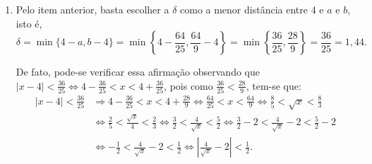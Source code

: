 \documentclass[12pt,a4paper]{article}
\begin{document}
\begin{ExerciseList}
\begin{enumerate}
\item Pelo item anterior, basta escolher a $\delta$ como a menor distância entre $4$ e $a$ e $b$, isto é,
\[
\delta
= \min\{ 4-a, b-4 \}
= \min\left\{ 4-\frac{64}{25}, \frac{64}{9}-4 \right\}
= \min\left\{ \frac{36}{25}, \frac{28}{9} \right\}
= \frac{36}{25}
= 1,44.
\]

De fato, pode-se verificar essa afirmação observando que
$|x-4| < \frac{36}{25}
\Leftrightarrow
4 - \frac{36}{25} < x < 4 + \frac{36}{25}$,
pois como $\frac{36}{25} < \frac{28}{9}$, tem-se que:
\begin{align*}
|x-4| < \frac{36}{25}
& \Rightarrow
4 - \frac{36}{25} < x < 4 + \frac{28}{9}
\Leftrightarrow
\frac{64}{25} < x < \frac{64}{9}
\Leftrightarrow
\frac{8}{5} < \sqrt{x} < \frac{8}{3}\\
& \Leftrightarrow
\frac{2}{5} < \frac{ \sqrt{x} }{4} < \frac{2}{3}
\Leftrightarrow
\frac{3}{2} < \frac{ 4 }{\sqrt{x}} < \frac{5}{2}
\Leftrightarrow
\frac{3}{2} - 2 < \frac{ 4 }{\sqrt{x}} - 2 < \frac{5}{2} - 2\\
& \Leftrightarrow
-\frac{1}{2} < \frac{ 4 }{\sqrt{x}} - 2 < \frac{1}{2}
\Leftrightarrow
\left| \frac{ 4 }{\sqrt{x}} - 2 \right| < \frac{1}{2}.
\end{align*}
\end{enumerate}


\end{ExerciseList}
\end{document}
